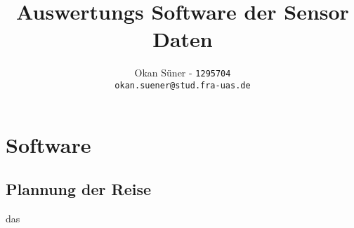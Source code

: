 \documentclass[a4paper,12pt]{article}
\title{Auswertungs Software der Sensor Daten}
\author{
    Okan Süner -
    \texttt{1295704}\\
    \texttt{okan.suener@stud.fra-uas.de}
}
\begin{document}
\begin{titlepage}

  \maketitle
  \thispagestyle{empty}

\end{titlepage}


\section{Software}

\subsection{Plannung der Reise}
das
\end{document}
